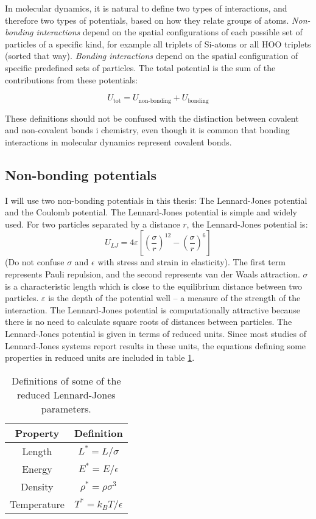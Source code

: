 In molecular dynamics, it is natural to define two types of interactions, and therefore two types of potentials, based on how they relate groups of atoms. \emph{Non-bonding interactions} depend on the spatial configurations of each possible set of particles of a specific kind, for example all triplets of Si-atoms or all HOO triplets (sorted that way). \emph{Bonding interactions} depend on the spatial configuration of specific predefined sets of particles. The total potential is the sum of the contributions from these potentials: 

\begin{equation}
	U_{\text{tot}} = U_{\text{non-bonding}} + U_{\text{bonding}} 
\end{equation}

These definitions should not be confused with the distinction between covalent and non-covalent bonds i chemistry, even though it is common that bonding interactions in molecular dynamics represent covalent bonds.

\subsection{Non-bonding potentials}
\label{sec:non_bonding_potentials}
I will use two non-bonding potentials in this thesis: The Lennard-Jones potential and the Coulomb potential.
The Lennard-Jones potential is simple and widely used. For two particles separated by a distance $r$, the Lennard-Jones potential is:
\begin{equation}
	U_{LJ} = 4\varepsilon\left[\left(\frac{\sigma}{r}\right)^{12} - \left(\frac{\sigma}{r}\right)^{6}\right]
\end{equation}
(Do not confuse $\sigma$ and $\epsilon$ with stress and strain in elasticity).
The first term represents Pauli repulsion, and the second represents van der Waals attraction. $\sigma$ is a characteristic length which is close to the equilibrium distance between two particles. $\varepsilon$ is the depth of the potential well -- a measure of the strength of the interaction. The Lennard-Jones potential is computationally attractive because there is no need to calculate square roots of distances between particles. The Lennard-Jones potential is given in terms of reduced units. Since most studies of Lennard-Jones systems report results in these units, the equations defining some properties in reduced units are included in table \ref{tbl:lj_parameters}.

\begin{table}
\centering
\caption{Definitions of some of the reduced Lennard-Jones parameters.}
\label{tbl:lj_parameters}
\begin{tabular}{c|c}
\textbf{Property} & \textbf{Definition} \\
\hline
Length & $L^* = L/\sigma$ \\
Energy & $E^* = E/\epsilon$ \\
Density & $\rho^* = \rho \sigma^3$ \\
Temperature & $T^* = k_BT/\epsilon$ \\
\end{tabular}
\end{table} 

